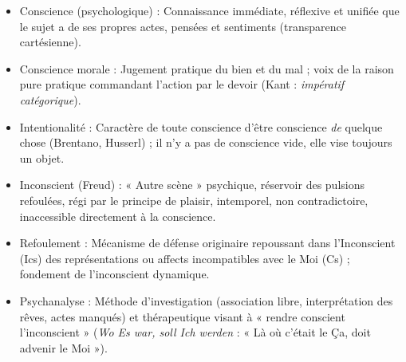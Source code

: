 \documentclass[11pt]{article}
\newcommand{\cle}[1]{{\popxbold\color{popdark}#1}}
\begin{document}
\begin{definition}
\begin{itemize}
    \item \cle{Conscience (psychologique)} : Connaissance immédiate, réflexive et unifiée que le sujet a de ses propres actes, pensées et sentiments (transparence cartésienne).
    \item \cle{Conscience morale} : Jugement pratique du bien et du mal ; voix de la raison pure pratique commandant l'action par le devoir (Kant : \emph{impératif catégorique}).
    \item \cle{Intentionalité} : Caractère de toute conscience d'être conscience \emph{de} quelque chose (Brentano, Husserl) ; il n'y a pas de conscience vide, elle vise toujours un objet.
    \item \cle{Inconscient (Freud)} : « Autre scène » psychique, réservoir des pulsions refoulées, régi par le principe de plaisir, intemporel, non contradictoire, inaccessible directement à la conscience.
    \item \cle{Refoulement} : Mécanisme de défense originaire repoussant dans l'Inconscient (Ics) des représentations ou affects incompatibles avec le Moi (Cs) ; fondement de l'inconscient dynamique.
    \item \cle{Psychanalyse} : Méthode d'investigation (association libre, interprétation des rêves, actes manqués) et thérapeutique visant à « rendre conscient l'inconscient » (\emph{Wo Es war, soll Ich werden} : « Là où c'était le Ça, doit advenir le Moi »).
\end{itemize}
\end{definition}
\end{document}
